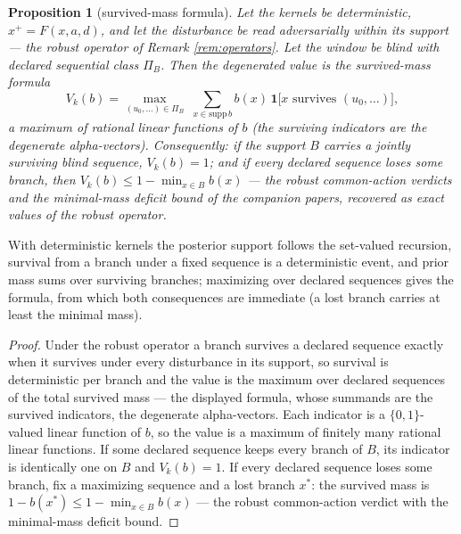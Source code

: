 \documentclass[10pt,twocolumn]{article}
\theoremstyle{plain}
\newtheorem{proposition}[theorem]{Proposition}
\theoremstyle{definition}
\theoremstyle{remark}
\begin{document}
\begin{proposition}[survived-mass formula]\label{prop:degen}
Let the kernels be deterministic, \(x^{+} = F(x, a, d)\), and let the
disturbance be read adversarially within its support --- the robust
operator of Remark \ref{rem:operators}. Let the window be blind with
declared sequential class \(\Pi_{B}\). Then the degenerated value is the
\emph{survived-mass formula}
\[
V_{k}(b) = \max_{(u_{0},\dots) \in \Pi_{B}}\;
\sum_{x \in \mathrm{supp}\, b} b(x)\,
\mathbf{1}\bigl[ x \text{ survives } (u_{0}, \dots) \bigr],
\]
a maximum of rational linear functions of \(b\) (the surviving indicators
are the degenerate alpha-vectors). Consequently: if the support \(B\)
carries a jointly surviving blind sequence, \(V_{k}(b) = 1\); and if every
declared sequence loses some branch, then
\(V_{k}(b) \le 1 - \min_{x \in B} b(x)\) --- the robust common-action
verdicts and the minimal-mass deficit bound of the companion papers,
recovered as exact values of the robust operator.
\end{proposition}

With deterministic kernels the posterior support follows the set-valued
recursion, survival from a branch under a fixed sequence is a
deterministic event, and prior mass sums over surviving branches;
maximizing over declared sequences gives the formula, from which both
consequences are immediate (a lost branch carries at least the minimal
mass).

\begin{proof}
Under the robust operator a branch survives a declared sequence exactly
when it survives under every disturbance in its support, so survival is
deterministic per branch and the value is the maximum over declared
sequences of the total survived mass --- the displayed formula, whose
summands are the survived indicators, the degenerate alpha-vectors.
Each indicator is a \(\{0,1\}\)-valued linear function of \(b\), so
the value is a maximum of finitely many rational linear functions. If
some declared sequence keeps every branch of \(B\), its indicator is
identically one on \(B\) and \(V_{k}(b) = 1\). If every declared
sequence loses some branch, fix a maximizing sequence and a lost branch
\(x^{*}\): the survived mass is \(1 - b(x^{*}) \le 1 -
\min_{x \in B} b(x)\) --- the robust common-action verdict with the
minimal-mass deficit bound.
\end{proof}
\end{document}
